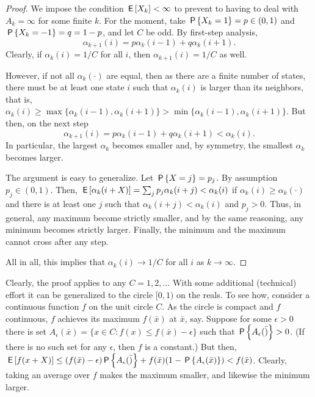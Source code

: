 \documentclass[stochastic-or.tex]{subfiles}
\begin{document}
\begin{proof}
We impose the condition $\E{X_{k}}<\infty$ to prevent to having to deal with $A_{k} = \infty$ for some finite $k$.
For the moment, take $\P{X_{k} = 1}=p \in (0, 1)$ and $\P{X_{k}=-1} = q=1-p$, and let $C$ be odd.
By first-step analysis,
\begin{equation*}
\alpha_{k+1}(i) = p \alpha_k(i-1) + q \alpha_k(i+1).
\end{equation*}
Clearly, if $\alpha_{k}(i)=1/C$ for all $i$, then $\alpha_{k+1}(i) = 1/C$ as well.

However, if not all $\alpha_{k}(\cdot)$ are equal, then as there are a finite number of states, there must be at least one state $i$ such that $\alpha_k(i)$ is larger than its neighbors, that is, $\alpha_{k}(i) \geq \max\{\alpha_k(i-1), \alpha_k(i+1)\} > \min\{\alpha_k(i-1),\alpha_k(i+1)\}$.
But then, on the next step
\begin{equation*}
\alpha_{k+1}(i) = p \alpha_k(i-1) + q \alpha_k(i+1) < \alpha_k(i).
\end{equation*}
In particular, the largest $\alpha_{k}$ becomes smaller and, by symmetry, the smallest $\alpha_{k}$ becomes larger.

The argument is easy to generalize.
Let $\P{X=j} = p_{j}$.
By assumption $p_{j} \in (0, 1)$.
Then, $\E{\alpha_k(i+X)} = \sum_{j} p_{j} \alpha_k(i+j) < \alpha_k(i)$ if $\alpha_k(i) \geq \alpha_{k}(\cdot)$ and there is at least one $j$ such that $\alpha_k(i+j) < \alpha_k(i)$ and $p_{j} > 0$.
Thus, in general, any maximum become strictly smaller, and by the same reasoning, any minimum becomes strictly larger.
Finally, the minimum and the maximum cannot cross after any step.

All in all, this implies that $\alpha_k(i) \to 1/C$ for all $i$ as $k\to \infty$.
\end{proof}

Clearly, the proof applies to any $C=1, 2, \ldots$
With some additional (technical) effort it can be generalized to the circle $[0, 1)$ on the reals.
To see how, consider a continuous function $f$ on the unit circle $C$.
As the circle is compact and $f$ continuous, $f$ achieves its maximum $f(\bar x)$ at $\bar x$, say.
Suppose for some $\epsilon>0$ there is set $A_{\epsilon}(\bar x) = \{x \in C: f(x) \leq f(\bar x) -\epsilon\}$ such that $\P{A_{\epsilon}(\bar )} > 0$.
(If there is no such set for any $\epsilon$, then $f$ is a constant.)
But then, $\E{f(x+X)} \leq (f(\bar x) -\epsilon) \P{A_{\epsilon}(\bar )} + f(\bar x) (1-\P{A_{\epsilon}(\bar x)}) < f(\bar x)$.
Clearly, taking an average over $f$ makes the maximum smaller, and likewise the minimum larger.
\end{document}
